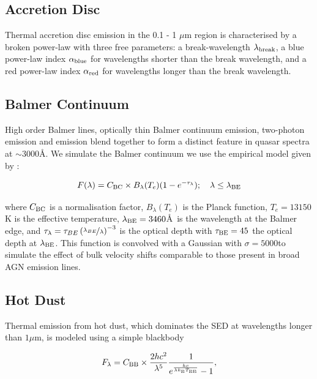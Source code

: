 \subsection{Accretion Disc}

Thermal accretion disc emission in the 0.1 - 1 $\mu$m region is characterised by a broken power-law with three free parameters: a break-wavelength $\lambda_{\rm break}$, a blue power-law index $\alpha_{\rm blue}$ for wavelengths shorter than the break wavelength, and a red power-law index $\alpha_{\rm red}$ for wavelengths longer than the break wavelength.

\subsection{Balmer Continuum}

High order Balmer lines, optically thin Balmer continuum emission, two-photon emission and  emission blend together to form a distinct feature in quasar spectra at $\sim3000$\AA. 
We simulate the Balmer continuum we use the empirical model given by \citet{grandi82}: 

\begin{equation}
  F(\lambda) = C_{\rm BC} \times B_\lambda(T_e)(1-e^{-\tau_\lambda}); \quad \lambda \leq \lambda_{\rm BE}
\end{equation}

where $C_{\rm BC}$ is a normalisation factor, $B_\lambda(T_e)$ is the Planck function, $T_e=13150$K is the effective temperature, $\lambda_{\rm BE}=3460$\AA\, is the wavelength at the Balmer edge, and $\tau_\lambda = \tau_{BE}\left( \nicefrac{\lambda_{BE}} {\lambda} \right)^{-3}$ is the optical depth with $\tau_{\rm BE}=45$ the optical depth at $\lambda_{\rm BE}$. 
This function is convolved with a Gaussian with $\sigma=5000$\kms to simulate the effect of bulk velocity shifts comparable to those present in broad \ac{AGN} emission lines. 

\subsection{Hot Dust}

Thermal emission from hot dust, which dominates the \ac{SED} at wavelengths longer than $1\mu$m, is modeled using a simple blackbody

\begin{eqnarray}  
  F_\lambda = C_{\rm BB} \times \frac{2 hc^2}{\lambda^5}\frac{1}{ e^{\frac{hc}{\lambda k_\mathrm{B}T_{\rm BB}}} - 1}, 
\end{eqnarray}

